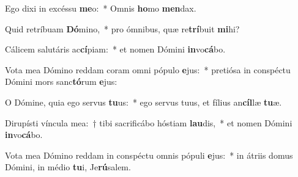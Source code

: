\item Ego dixi in excéssu \textbf{me}o:~* Omnis \textbf{ho}mo \textbf{men}dax.
\item Quid retríbuam \textbf{Dó}mino,~* pro ómnibus, quæ re\textbf{trí}buit \textbf{mi}hi?
\item Cálicem salutáris ac\textbf{cí}piam:~* et nomen Dómini \textbf{in}vo\textbf{cá}bo.
\item Vota mea Dómino reddam coram omni pópulo \textbf{e}jus:~* pretiósa in conspéctu Dómini mors sanc\textbf{tó}rum \textbf{e}jus:
\item O Dómine, quia ego servus \textbf{tu}us:~* ego servus tuus, et fílius an\textbf{cíl}læ \textbf{tu}æ.
\item Dirupísti víncula mea:~† tibi sacrificábo hóstiam \textbf{lau}dis,~* et nomen Dómini \textbf{in}vo\textbf{cá}bo.
\item Vota mea Dómino reddam in conspéctu omnis pópuli \textbf{e}jus:~* in átriis domus Dómini, in médio \textbf{tu}i, Je\textbf{rú}salem.

